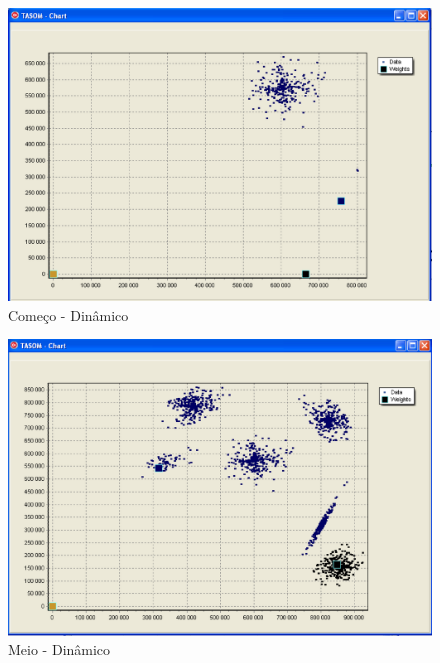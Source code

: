 \begin{figure}[!h]
\centering
\includegraphics[keepaspectratio=true,scale=0.5]
{figuras/tsom1.eps}
\caption{Começo - Dinâmico}
\label{data_titatic}
\end{figure}  

\begin{figure}[!h]
\centering
\includegraphics[keepaspectratio=true,scale=0.5]
{figuras/tsom2.eps}
\caption{Meio - Dinâmico}
\label{data_titatic}
\end{figure}

